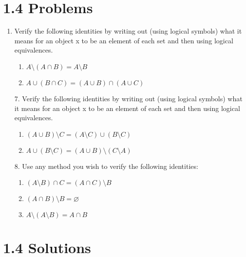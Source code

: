 \documentclass{scrartcl}
\begin{document}
    \section*{1.4 Problems}

    \begin{enumerate}[start=5]
        \item Verify the following identities by writing out (using logical symbols) what it means for an object x to be an element of each set and then using logical equivalences.
            \begin{enumerate}
                \item $A \setminus (A \cap B) = A \setminus B$
                \item $A \cup (B \cap C) = (A \cup B) \cap (A \cup C)$
            \end{enumerate}

        \item[7.] Verify the following identities by writing out (using logical symbols) what it means for an object x to be an element of each set and then using logical equivalences.
            \begin{enumerate}
                \item $(A \cup B) \setminus C = (A \setminus C) \cup (B \setminus C)$
                \item $A \cup (B \setminus C) = (A \cup B) \setminus (C \setminus A)$
            \end{enumerate}
    
        \item[8.] Use any method you wish to verify the following identities:
            \begin{enumerate}
                \item $(A \setminus B) \cap C = (A \cap C) \setminus B$
                \item $(A \cap B) \setminus B = \varnothing$
                \item $A \setminus (A \setminus B) = A \cap B$
            \end{enumerate}

    \end{enumerate}

    \section*{1.4 Solutions}
\end{document}
